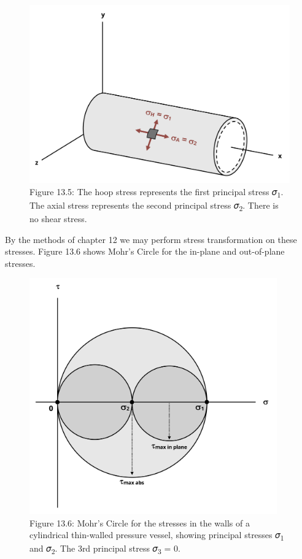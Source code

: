 \documentclass[
  letterpaper,
  DIV=11,
  numbers=noendperiod]{scrreprt}
\begin{document}
\begin{figure}[H]

{\centering \includegraphics[width=5.17708in,height=\textheight]{images/CH13 PNGs/figure 13.5.png}

}

\caption{Figure 13.5: The hoop stress represents the first principal
stress 𝜎\textsubscript{1}. The axial stress represents the second
principal stress 𝜎\textsubscript{2}. There is no shear stress.}

\end{figure}%

By the methods of chapter 12 we may perform stress transformation on
these stresses. Figure 13.6 shows Mohr's Circle for the in-plane and
out-of-plane stresses.

\begin{figure}[H]

{\centering \includegraphics[width=4.19792in,height=\textheight]{images/CH13 PNGs/figure 13.6.png}

}

\caption{Figure 13.6: Mohr's Circle for the stresses in the walls of a
cylindrical thin-walled pressure vessel, showing principal stresses
𝜎\textsubscript{1} and 𝜎\textsubscript{2}. The 3rd principal stress
𝜎\textsubscript{3} = 0.}

\end{figure}%
\end{document}
